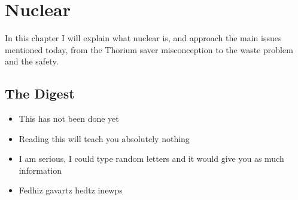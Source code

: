 \setchapterpreamble[u]{\margintoc}
\chapter{Nuclear}

In this chapter I will explain what nuclear is, and approach the main issues mentioned today, from the Thorium saver misconception to the waste problem and the safety.


\blindtext


\section{The Digest}


\begin{kaoboxgreen}[frametitle=Main Takeaways]

\begin{itemize}
\item This has not been done yet
\item Reading this will teach you absolutely nothing
\item I am serious, I could type random letters and it would give you as much information
\item Fedhiz gavartz hedtz inewps
\end{itemize}
  
\end{kaoboxgreen}